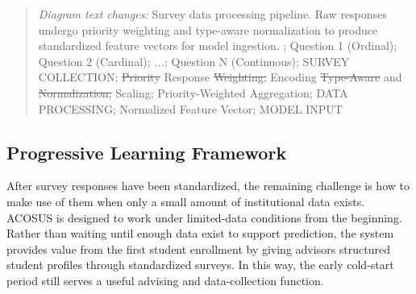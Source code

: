 \documentclass[letterpaper,11pt]{article}
\newcommand{\DIFdel}[1]{%
  \begingroup\setlength{\fboxsep}{0.5pt}%
  \colorbox{diffdelbg}{\textcolor{diffdeltext}{\sout{#1}}}%
  \endgroup}
\newcommand{\DIFadd}[1]{%
  \begingroup\setlength{\fboxsep}{0.5pt}%
  \colorbox{diffaddbg}{\textcolor{diffaddtext}{#1}}%
  \endgroup}
\begin{document}
\begin{figure}[htbp]
{
}
\end{figure}

\begin{quote}\footnotesize
\textit{Diagram text changes:} \DIFadd{Survey} \DIFadd{data} \DIFadd{processing} \DIFadd{pipeline.} \DIFadd{Raw} \DIFadd{responses} \DIFadd{undergo} \DIFadd{priority} \DIFadd{weighting} \DIFadd{and} \DIFadd{type-aware} \DIFadd{normalization} \DIFadd{to} \DIFadd{produce} \DIFadd{standardized} \DIFadd{feature} \DIFadd{vectors} \DIFadd{for} \DIFadd{model} \DIFadd{ingestion.}; Question 1 (Ordinal); Question 2 (Cardinal); \textit{...}; Question N (Continuous); SURVEY COLLECTION; \DIFdel{Priority} \DIFadd{Response} \DIFdel{Weighting;} \DIFadd{Encoding} \DIFdel{Type-Aware} \DIFadd{and} \DIFdel{Normalization;} \DIFadd{Scaling;} \DIFadd{Priority-Weighted} \DIFadd{Aggregation;} DATA PROCESSING; Normalized Feature Vector; MODEL INPUT
\end{quote}

\subsection{Progressive Learning Framework}\label{subsec:progressive}

After survey responses have been standardized, the remaining challenge is how to make use of them when only a small amount of institutional data exists. ACOSUS is designed to work under limited-data conditions from the beginning. Rather than waiting until enough data exist to support prediction, the system provides value from the first student enrollment by giving advisors structured student profiles through standardized surveys. In this way, the early cold-start period still serves a useful advising and data-collection function.
\end{document}
